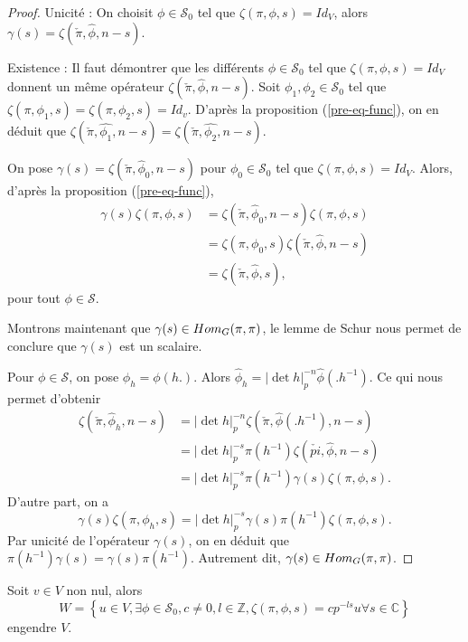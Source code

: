 \begin{proof}
Unicité : On choisit $\phi \in \mathcal{S}_0$ tel que $\zeta(\pi,\phi,s)=Id_V$, alors $\gamma(s)=\zeta(\check{\pi}, \hat{\phi}, n-s)$.

Existence : Il faut démontrer que les différents $\phi \in \mathcal{S}_0$ tel que $\zeta(\pi,\phi,s)=Id_V$ donnent un même opérateur $\zeta(\check{\pi},\hat{\phi}, n-s)$. Soit $\phi_1,\phi_2 \in \mathcal{S}_0$ tel que $\zeta(\pi,\phi_1,s)=\zeta(\pi,\phi_2,s)=Id_v$. D'après la proposition (\ref{pre-eq-func}), on en déduit que $\zeta(\check{\pi},\hat{\phi_1}, n-s)=\zeta(\check{\pi},\hat{\phi_2}, n-s)$.

On pose $\gamma(s)=\zeta(\check{\pi},\hat{\phi}_0, n-s)$ pour $\phi_0 \in \mathcal{S}_0$ tel que $\zeta(\pi,\phi,s)=Id_V$. Alors, d'après la proposition (\ref{pre-eq-func}),
\begin{align}
\gamma(s)\zeta(\pi,\phi,s) &= \zeta(\check{\pi},\hat{\phi}_0, n-s)\zeta(\pi,\phi,s) \\
&= \zeta(\pi,\phi_0,s)\zeta(\check{\pi}, \hat{\phi}, n-s) \\
&= \zeta(\check{\pi}, \hat{\phi},s),
\end{align}
pour tout $\phi \in \mathcal{S}$.

Montrons maintenant que $\gamma(s) \in \operatorname{\mathnormal{Hom}}_G(\pi,\pi)$, le lemme de Schur nous permet de conclure que $\gamma(s)$ est un scalaire.

Pour $\phi \in \mathcal{S}$, on pose $\phi_h = \phi(h.)$. Alors $\hat{\phi}_h = |\det h|_p^{-n}\hat{\phi}(.h^{-1})$. Ce qui nous permet d'obtenir
\begin{align}
\zeta(\check{\pi}, \hat{\phi}_h, n-s)&=|\det h|_p^{-n}\zeta(\check{\pi}, \hat{\phi}(.h^{-1}),n-s) \\
&= |\det h|_p^{-s}\pi(h^{-1})\zeta(\check{pi}, \hat{\phi}, n-s) \\
&= |\det h|_p^{-s}\pi(h^{-1})\gamma(s)\zeta(\pi,\phi,s).
\end{align}
D'autre part, on a
\begin{equation}
\gamma(s)\zeta(\pi,\phi_h,s)=|\det h|_p^{-s}\gamma(s)\pi(h^{-1})\zeta(\pi,\phi,s).
\end{equation}
Par unicité de l'opérateur $\gamma(s)$, on en déduit que $\pi(h^{-1})\gamma(s)=\gamma(s)\pi(h^{-1})$. Autrement dit, $\gamma(s) \in \operatorname{\mathnormal{Hom}}_G(\pi,\pi)$.
\end{proof}

\begin{lemme}
Soit $v \in V$ non nul, alors
$$W=\left\lbrace u \in V, \exists \phi \in \mathcal{S}_0, c \neq 0, l \in \mathbb{Z}, \zeta(\pi, \phi, s) = cp^{-ls}u \forall s \in \mathbb{C} \right\rbrace$$
engendre $V$.
\end{lemme}

